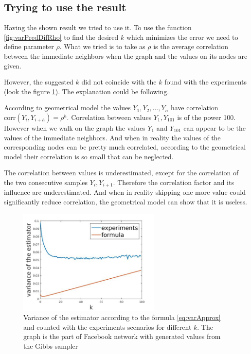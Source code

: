 \documentclass[12pt]{report}
\begin{document}
\subsection{Trying to use the result}

Having the shown result we tried to use it. To use the function \ref{fig:varPredDifRho} to find the desired $k$ which minimizes the error we need to define parameter $\rho$. What we tried is to take as $\rho$ is the average correlation between the immediate neighbors when the graph and the values on its nodes are given.

However, the suggested $k$ did not coincide with the $k$ found with the experiments (look the figure \ref{fig:facebookBad}). The explanation could be following. 

According to geometrical model the values $Y_1, Y_2, ..., Y_n$ have correlation $\mathrm{corr}(Y_i, Y_{i+h}) = \rho^h$. Correlation between values $Y_1, Y_{101}$ is of the power 100. However when we walk on the graph the values $Y_1$ and $Y_{101}$ can appear to be the values of the immediate neighbors. And when in reality the values of the corresponding nodes can be pretty much correlated, according to the geometrical model their correlation is so small that can be neglected.

The correlation between values is underestimated, except for the correlation of the two consecutive samples $Y_i, Y_{i+1}$. Therefore the correlation factor and its influence are underestimated. And when in reality skipping one more value could significantly reduce correlation,  the geometrical model can show that it is useless.

\begin{figure}[ht]
    \centering
    \includegraphics[height=200px]{facebookBad}
    \caption{Variance of the estimator according to the formula \ref{eq:varApprox} and counted with the experiments scenarios for different $k$. The graph is the part of Facebook network \cite{Facebook} with generated values from the Gibbs sampler}
    \label{fig:facebookBad}
\end{figure}
\end{document}
